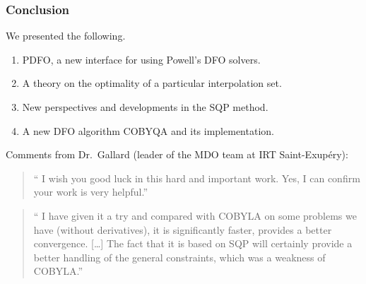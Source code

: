 \documentclass{polyu-presentation}
\begin{document}
\begin{frame}
    \frametitle{Conclusion}

	We presented the following.
    \begin{enumerate}
        \item \alert{PDFO}, a new interface for using Powell's DFO solvers.
        \item A theory on the \alert{optimality} of a particular interpolation set.
        \item New perspectives and developments in the \alert{SQP method}.
        \item A new DFO algorithm \alert{COBYQA} and its implementation.
    \end{enumerate}

    Comments from Dr.\ Gallard (leader of the MDO team at IRT Saint-Exup{\'{e}}ry):

    \begin{block}{}
        \begin{quote}
            \small\enquote{%
            I wish you good luck in this hard and important work.
            Yes, I can confirm your work is very helpful.}
        \end{quote}
    \end{block}

    \begin{block}{}
        \begin{quote}
            \small\enquote{%
                I have given it a try and compared with COBYLA on some problems we have (without derivatives), it is significantly faster, provides a better convergence.
                [\dots] The fact that it is based on SQP will certainly provide a better handling of the general constraints, which was a weakness of COBYLA.}
        \end{quote}
    \end{block}
\end{frame}
\end{document}
